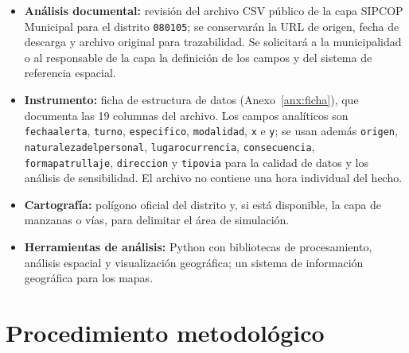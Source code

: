 \begin{itemize}
    \item \textbf{Análisis documental:} revisión del archivo CSV público de la capa SIPCOP Municipal para el distrito \texttt{080105}; se conservarán la URL de origen, fecha de descarga y archivo original para trazabilidad. Se solicitará a la municipalidad o al responsable de la capa la definición de los campos y del sistema de referencia espacial.
    \item \textbf{Instrumento:} ficha de estructura de datos (Anexo~\ref{anx:ficha}), que documenta las 19 columnas del archivo. Los campos analíticos son \texttt{fechaalerta}, \texttt{turno}, \texttt{especifico}, \texttt{modalidad}, \texttt{x} e \texttt{y}; se usan además \texttt{origen}, \texttt{naturalezadelpersonal}, \texttt{lugarocurrencia}, \texttt{consecuencia}, \texttt{formapatrullaje}, \texttt{direccion} y \texttt{tipovia} para la calidad de datos y los análisis de sensibilidad. El archivo no contiene una hora individual del hecho.
    \item \textbf{Cartografía:} polígono oficial del distrito y, si está disponible, la capa de manzanas o vías, para delimitar el área de simulación.
    \item \textbf{Herramientas de análisis:} Python con bibliotecas de procesamiento, análisis espacial y visualización geográfica; un sistema de información geográfica para los mapas.
\end{itemize}

\section{Procedimiento metodológico}

